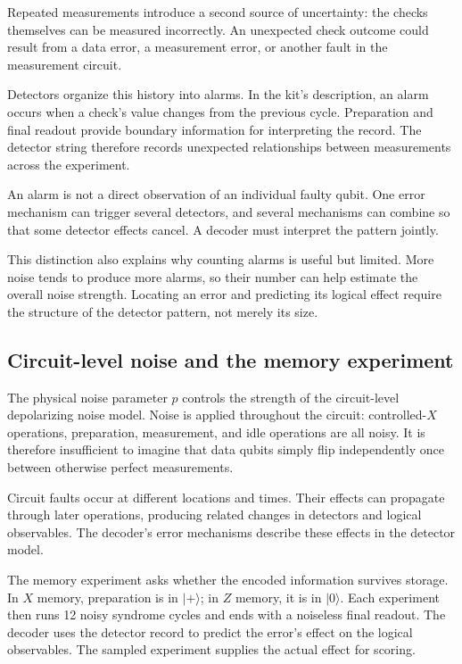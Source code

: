 Repeated measurements introduce a second source of uncertainty: the checks themselves can be measured incorrectly. An unexpected check outcome could result from a data error, a measurement error, or another fault in the measurement circuit.

Detectors organize this history into alarms. In the kit's description, an alarm occurs when a check's value changes from the previous cycle. Preparation and final readout provide boundary information for interpreting the record. The detector string therefore records unexpected relationships between measurements across the experiment.

An alarm is not a direct observation of an individual faulty qubit. One error mechanism can trigger several detectors, and several mechanisms can combine so that some detector effects cancel. A decoder must interpret the pattern jointly.

This distinction also explains why counting alarms is useful but limited. More noise tends to produce more alarms, so their number can help estimate the overall noise strength. Locating an error and predicting its logical effect require the structure of the detector pattern, not merely its size.

\subsection{Circuit-level noise and the memory experiment}

The physical noise parameter $p$ controls the strength of the circuit-level depolarizing noise model. Noise is applied throughout the circuit: controlled-$X$ operations, preparation, measurement, and idle operations are all noisy. It is therefore insufficient to imagine that data qubits simply flip independently once between otherwise perfect measurements.

Circuit faults occur at different locations and times. Their effects can propagate through later operations, producing related changes in detectors and logical observables. The decoder's error mechanisms describe these effects in the detector model.

The memory experiment asks whether the encoded information survives storage. In $X$ memory, preparation is in $|+\rangle$; in $Z$ memory, it is in $|0\rangle$. Each experiment then runs 12 noisy syndrome cycles and ends with a noiseless final readout. The decoder uses the detector record to predict the error's effect on the logical observables. The sampled experiment supplies the actual effect for scoring.

